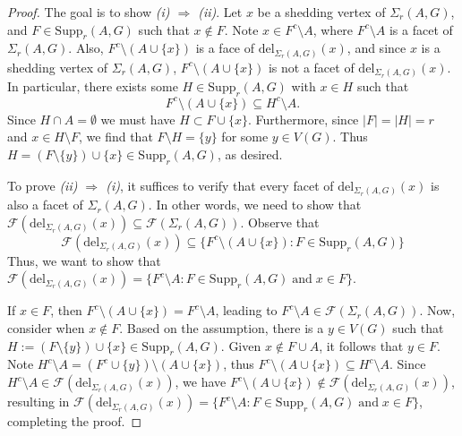 \documentclass[12pt,reqno]{amsart}
\theoremstyle{definition}
\newcommand{\del}{{\mathrm{del}}}
\newcommand{\Supp}{\mathrm{Supp}}
\def\F{\mathcal{F}}
\def\del{\mathrm{del}}
\begin{document}
\begin{proof}	
The goal is to show \emph{(i) $\Rightarrow$ (ii)}. 
Let $x$ be a shedding vertex of $\Sigma_r(A,G)$, and $F \in \mathrm{Supp}_r(A,G)$ such that $x \notin F$. 
Note $x \in F^{c}\setminus A$, where $F^c\setminus A$ is a facet of $\Sigma_r(A,G)$. 
Also, $F^{c} \setminus (A \cup \{x\})$ is a face of $\del_{\Sigma_r(A,G)}(x)$, and since $x$ is a shedding vertex of $\Sigma_r(A,G)$, $F^{c} \setminus (A \cup \{x\})$ is not a facet of $\del_{\Sigma_r(A,G)}(x)$. 
In particular, there exists some $H \in \mathrm{Supp}_r(A,G)$ with $x \in H$ such that 
\[
F^{c} \setminus (A \cup \{x\}) \subseteq H^{c} \setminus A.
\]
Since $H\cap A=\emptyset$ we must have $H \subset F \cup \{x\}$. Furthermore, since $|F|=|H|=r$ and $x\in H\setminus F$, we find that $F \setminus H = \{y\}$ for some $y \in V(G)$. Thus $H=(F \setminus \{y\}) \cup \{x\} \in \mathrm{Supp}_r(A,G)$, as desired.
		
To prove \emph{(ii) $\Rightarrow$ (i)}, it suffices to verify that every facet of $\mathrm{del}_{\Sigma_r(A,G)}(x)$ is also a facet of $\Sigma_r(A,G)$. In other words, we need to show that $\mathcal{F}(\mathrm{del}_{\Sigma_r(A,G)}(x)) \subseteq \mathcal{F}(\Sigma_r(A,G))$.
Observe that
		\[
		\mathcal{F}(\mathrm{del}_{\Sigma_r(A,G)}(x)) \subseteq \{F^{c} \setminus (A \cup \{x\}) : F \in \mathrm{Supp}_r(A,G)\} 
		\]
Thus, we want to show that  $\mathcal{F}(\mathrm{del}_{\Sigma_r(A,G)}(x)) = \{F^{c}\setminus A : F \in \Supp_r(A,G) \; \text{and} \; x\in F\}$.
		
If $x\in F$, then $F^{c} \setminus (A \cup \{x\}) = F^{c} \setminus A$, leading to $F^{c} \setminus A\in \mathcal{F}(\Sigma_r(A,G))$. 
Now, consider when $x \notin F$. 
Based on the assumption, there is a $y\in V(G)$ such that $H := (F \setminus \{y\}) \cup \{x\} \in \mathrm{Supp}_r(A,G)$. 
Given $x\notin F\cup A$, it follows that $y\in F$. Note $H^{c} \setminus A = (F^{c} \cup \{y\}) \setminus (A \cup \{x\})$, thus $F^{c} \setminus (A \cup \{x\}) \subseteq H^{c} \setminus A$. 
Since $H^c\setminus A\in \F( \del_{\Sigma_r(A,G)}(x))$, we have $F^c\setminus (A\cup\{x\})\notin \mathcal{F}(\mathrm{del}_{\Sigma_r(A,G)}(x))$, resulting in $\mathcal{F}(\mathrm{del}_{\Sigma_r(A,G)}(x)) = \{F^{c}\setminus A : F \in \Supp_r(A,G) \; \text{and} \; x\in F\}$, completing the proof.   
\end{proof}
\end{document}
